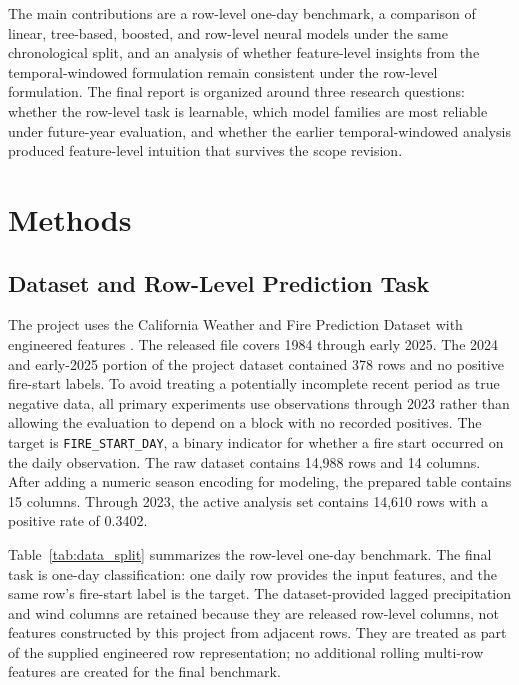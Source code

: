 \documentclass{article}
\begin{document}
The main contributions are a row-level one-day benchmark, a comparison of linear, tree-based, boosted, and row-level neural models under the same chronological split, and an analysis of whether feature-level insights from the temporal-windowed formulation remain consistent under the row-level formulation. The final report is organized around three research questions: whether the row-level task is learnable, which model families are most reliable under future-year evaluation, and whether the earlier temporal-windowed analysis produced feature-level intuition that survives the scope revision.

\section{Methods}

\subsection{Dataset and Row-Level Prediction Task}

The project uses the California Weather and Fire Prediction Dataset with engineered features \citep{yavas2025california}. The released file covers 1984 through early 2025. The 2024 and early-2025 portion of the project dataset contained 378 rows and no positive fire-start labels. To avoid treating a potentially incomplete recent period as true negative data, all primary experiments use observations through 2023 rather than allowing the evaluation to depend on a block with no recorded positives. The target is \texttt{FIRE\_START\_DAY}, a binary indicator for whether a fire start occurred on the daily observation. The raw dataset contains 14,988 rows and 14 columns. After adding a numeric season encoding for modeling, the prepared table contains 15 columns. Through 2023, the active analysis set contains 14,610 rows with a positive rate of 0.3402.

Table~\ref{tab:data_split} summarizes the row-level one-day benchmark. The final task is one-day classification: one daily row provides the input features, and the same row's fire-start label is the target. The dataset-provided lagged precipitation and wind columns are retained because they are released row-level columns, not features constructed by this project from adjacent rows. They are treated as part of the supplied engineered row representation; no additional rolling multi-row features are created for the final benchmark.
\end{document}
